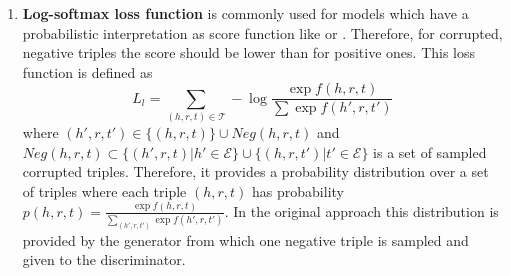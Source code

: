 \begin{enumerate}
    
    \item 
    \textbf{Log-softmax loss function} is commonly used for models which have a probabilistic interpretation as score function like \distmult or \complex.
    Therefore, for corrupted, negative triples the score should be lower than for positive ones.
    This loss function is defined as
    \begin{equation} \label{eq:nllloss}
        L_{l}=\sum_{(h,r,t)\in\mathcal{T}}-\log \frac{\exp f(h,r,t)}{\sum\exp f(h',r,t')}
    \end{equation}
    where $(h',r,t')\in\{(h,r,t)\}\cup Neg(h,r,t)$ and $Neg(h,r,t)\subset\{(h',r,t)|h'\in\mathcal{E}\}\cup\{(h,r,t')|t'\in\mathcal{E}\}$ is a set of sampled corrupted triples.
    Therefore, it provides a probability distribution over a set of triples where each triple $(h, r, t)$ has probability $p(h,r,t)=\frac{\exp f(h,r,t)}{\sum_{(h',r,t')}\exp f(h',r,t')}$.
    In the original \kbgan approach this distribution is provided by the generator from which one negative triple is sampled and given to the discriminator.
\end{enumerate}


